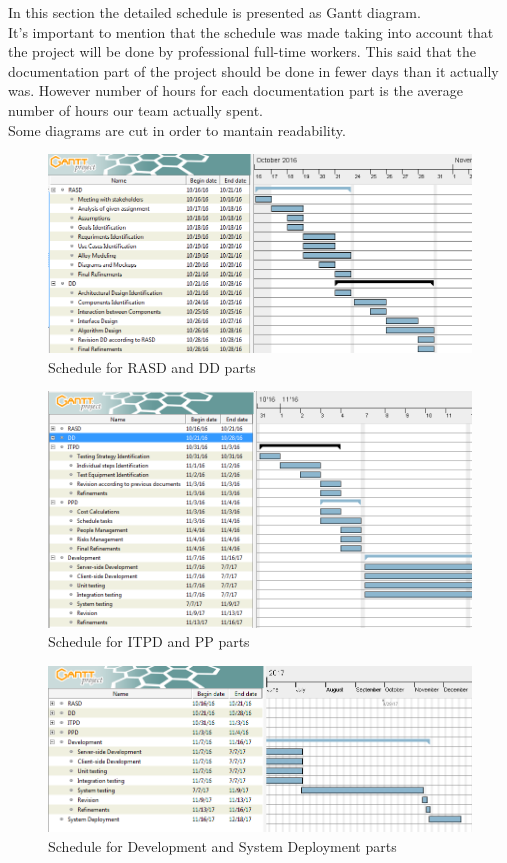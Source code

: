 

In this section the detailed schedule is presented as Gantt diagram.\\
It's important to mention that the schedule was made taking into account that the project will be done by professional full-time workers. This said that the documentation part of the project should be done in fewer days than it actually was. However number of hours for each documentation part is the average number of hours our team actually spent.\\
Some diagrams are cut in order to mantain readability.\\
 
	\begin{figure}[h]
		\includegraphics[scale=0.55]{img/Sched1.png}
		\caption{Schedule for RASD and DD parts}
	\end{figure}
	\begin{figure}[h]
		\includegraphics[scale=0.55]{img/Sched2.png}
		\caption{Schedule for ITPD and PP parts}
	\end{figure}
	\begin{figure}[h]
		\includegraphics[scale=0.55]{img/Sched3.png}
		\caption{Schedule for Development and System Deployment parts}
	\end{figure}
\FloatBarrier
